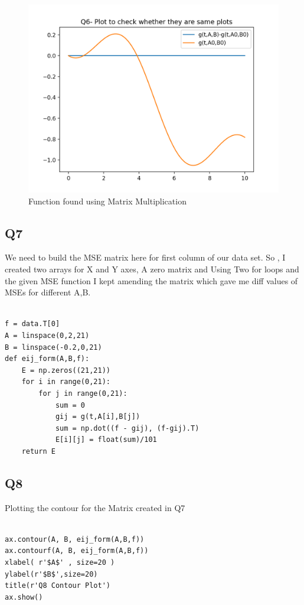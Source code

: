 \documentclass[12pt, a4paper]{report}
\begin{document}
\begin{figure}[!tbh]
   	\centering
   	\includegraphics[scale=0.5]{Qn6.png}
	\caption{Function found using Matrix Multiplication}
   	\label{fig:trueMatrix}
   \end{figure}

 \subsection{Q7}
 We need to build the MSE matrix here for first column of our data set. So , I created two arrays for X and Y axes, A zero matrix and Using Two for loops and the given MSE function I kept amending the matrix which gave me diff values of MSEs for different A,B.
 
 \begin{Verbatim}

f = data.T[0]
A = linspace(0,2,21)
B = linspace(-0.2,0,21)
def eij_form(A,B,f):
    E = np.zeros((21,21))
    for i in range(0,21):
        for j in range(0,21):
            sum = 0
            gij = g(t,A[i],B[j])
            sum = np.dot((f - gij), (f-gij).T)
            E[i][j] = float(sum)/101
    return E
\end{Verbatim}

 \subsection{Q8}
 Plotting the contour for the Matrix created in Q7
 
 \begin{Verbatim}

ax.contour(A, B, eij_form(A,B,f))
ax.contourf(A, B, eij_form(A,B,f))
xlabel( r'$A$' , size=20 )
ylabel(r'$B$',size=20)
title(r'Q8 Contour Plot')
ax.show()
\end{Verbatim}
\end{document}
